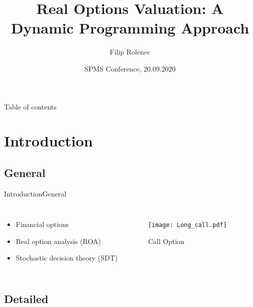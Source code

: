\documentclass[us]{beamer}
\title{Real Options Valuation: A Dynamic Programming Approach}
\author{Filip Rolenec}
\institute[CTU-FNSPE] %
{
  \inst{}%
  Czech technical university in Prague\\
  FNSPE \\
  Department of Mathematics
 
}
\date{SPMS Conference, 20.09.2020}
\begin{document}
\begin{frame}
  \titlepage
\end{frame}

\begin{frame}{Table of contents}
  \tableofcontents
\end{frame}


\section{Introduction}

\subsection{General}

\begin{frame}{Introduction}{General}

	\begin{columns}
 		\begin{itemize}
 			\item {Financial options}
			\item {Real option analysis (ROA)}
			\item {Stochastic decision theory (SDT)}
		\end{itemize}	
		\begin{figure}
			\texttt{[image: Long\_call.pdf]}
			\caption{Call Option \cite{Investopedia}}
		\end{figure}
\end{columns}	

\end{frame}

\subsection{Detailed}
\end{document}
